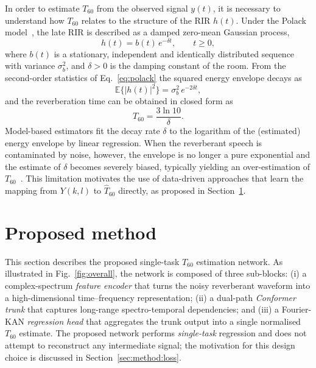 \documentclass[a4paper,fleqn]{cas-dc}
\begin{document}
In order to estimate $T_{60}$ from the observed signal $y(t)$, it is
necessary to understand how $T_{60}$ relates to the structure of the
RIR $h(t)$. Under the Polack model~\citep{polack1988these}, the late
RIR is described as a damped zero-mean Gaussian process,
\begin{equation}\label{eq:polack}
  h(t) = b(t)\, e^{-\delta t},\qquad t\geq 0,
\end{equation}
where $b(t)$ is a stationary, independent and identically distributed
sequence with variance $\sigma_b^{2}$, and $\delta>0$ is the damping
constant of the room. From the second-order statistics of
Eq.~\eqref{eq:polack} the squared energy envelope decays as
\begin{equation}\label{eq:envelope}
  \mathbb{E}\{|h(t)|^{2}\} = \sigma_b^{2}\,e^{-2\delta t},
\end{equation}
and the reverberation time can be obtained in closed form as
\begin{equation}\label{eq:t60_from_delta}
  T_{60} = \frac{3\ln 10}{\delta}.
\end{equation}
Model-based estimators fit the decay rate $\delta$ to the logarithm of
the (estimated) energy envelope by linear regression. When the
reverberant speech is contaminated by noise, however, the envelope is
no longer a pure exponential and the estimate of $\delta$ becomes
severely biased, typically yielding an over-estimation of
$T_{60}$~\citep{gaubitch2012comparison}. This limitation motivates the
use of data-driven approaches that learn the mapping from $Y(k,l)$ to
$\hat{T}_{60}$ directly, as proposed in
Section~\ref{sec:method}.

\section{Proposed method}\label{sec:method}

This section describes the proposed single-task $T_{60}$ estimation
network. As illustrated in Fig.~\ref{fig:overall}, the
network is composed of three sub-blocks: (i) a complex-spectrum
\emph{feature encoder} that turns the noisy reverberant waveform into a
high-dimensional time--frequency representation; (ii) a dual-path
\emph{Conformer trunk} that captures long-range spectro-temporal
dependencies; and (iii) a Fourier-KAN \emph{regression head} that
aggregates the trunk output into a single normalised $T_{60}$ estimate.
The proposed network performs \emph{single-task} regression and does
not attempt to reconstruct any intermediate signal; the motivation for
this design choice is discussed in Section~\ref{sec:method:loss}.
\end{document}
